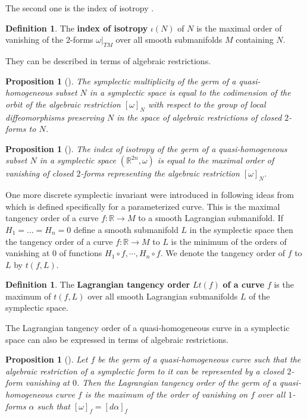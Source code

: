 \documentclass{amsart}
\newtheorem{prop}[thm]{Proposition}
\theoremstyle{definition}
\newtheorem{defn}[thm]{Definition}
\numberwithin{equation}{section}
\begin{document}
The second one is the index of isotropy \cite{DJZ2}.

\begin{defn}
The {\bf index of isotropy} $\iota(N)$ of $N$ is the maximal
order of vanishing of the $2$-forms $\omega \vert _{TM}$ over all
smooth submanifolds $M$ containing $N$.
\end{defn}

They can be described in terms of algebraic restrictions.

\begin{prop}[\cite{DJZ2}]\label{sm}
The symplectic multiplicity  of the germ of a quasi-homogeneous subset $N$ in a
symplectic space is equal to the codimension of the orbit of the
algebraic restriction $[\omega ]_N$ with respect to the group of
local diffeomorphisms preserving $N$  in the space of algebraic
restrictions of closed  $2$-forms to $N$.
\end{prop}

\begin{prop}[\cite{DJZ2}]\label{ii}
The index of isotropy  of the germ of a quasi-homogeneous subset $N$ in a
symplectic space $(\mathbb R^{2n}, \omega )$ is equal to the
maximal order of vanishing of closed $2$-forms representing the
algebraic restriction $[\omega ]_N$.
\end{prop}

One more discrete symplectic invariant were introduced in \cite{D}
following ideas from \cite{Ar1} which is defined specifically for
a parameterized curve. This is the maximal tangency order of a
curve $f:\mathbb R\rightarrow M$ to a smooth Lagrangian
submanifold. If $H_1=...=H_n=0$ define a smooth submanifold $L$ in
the symplectic space then the tangency order of a curve $f:\mathbb
R\rightarrow M$ to $L$ is the minimum of the orders of vanishing
at $0$ of functions $H_1\circ f,\cdots, H_n\circ f$. We denote the
tangency order of $f$ to $L$ by $t(f,L)$.

\begin{defn}
The {\bf Lagrangian tangency order} $Lt(f)$\textbf{ of a curve} $f$ is the
maximum of $t(f,L)$ over all smooth Lagrangian submanifolds $L$ of
the symplectic space.
\end{defn}

The Lagrangian tangency order of a quasi-homogeneous curve in a
symplectic space can also be  expressed in terms of algebraic
restrictions.

\begin{prop}[\cite{D}]\label{lto}
Let $f$ be the germ of a quasi-homogeneous curve such that the
algebraic restriction of a symplectic form to it can be
represented by a closed $2$-form vanishing at $0$. Then the
Lagrangian tangency order of the germ of a quasi-homogeneous curve
$f$ is the maximum of the order of vanishing on $f$ over all
$1$-forms $\alpha$ such that $[\omega]_f=[d\alpha]_f$
\end{prop}
\end{document}
